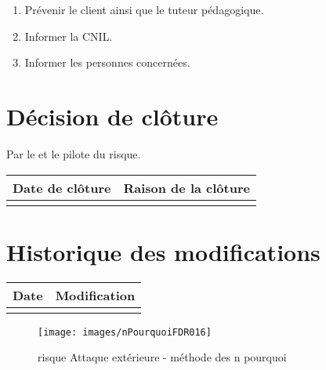 \begin{enumerate}
	\item Prévenir le client ainsi que le tuteur pédagogique.
	\item Informer la CNIL.
        \item Informer les personnes concernées.
\end{enumerate}

\section*{Décision de clôture}
Par le \CP{} et le pilote du risque.
\begin{table}[H]
\centering
	\begin{tabularx}{16.8cm}{|X|X|}
	\hline
	\rowcolor{gray!40} Date de clôture & Raison de la clôture \\
	\hline
	  & \\
	\hline
	\end{tabularx}
\end{table}

\section*{Historique des modifications}
\begin{table}[H]
\centering
	\begin{tabularx}{16.8cm}{|X|X|}
	\hline
	\rowcolor{gray!40} Date & Modification \\
	\hline
	  & \\
	\hline
	\end{tabularx}
\end{table}
\newpage


\begin{figure}
	\centering
	\texttt{[image: images/nPourquoiFDR016]}
	\caption{\label{Attaque exterieure}risque Attaque extérieure - méthode des n pourquoi}
\end{figure}
